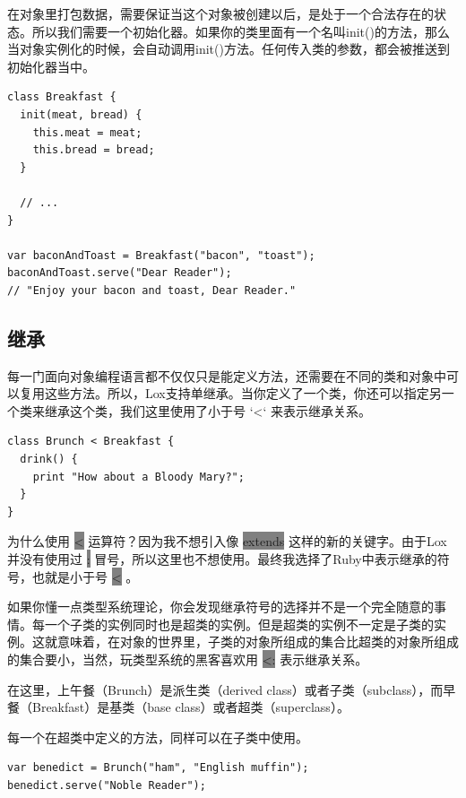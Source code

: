 \documentclass[cn,10pt,math=newtx,citestyle=gb7714-2015,bibstyle=gb7714-2015]{elegantbook}
\begin{document}
在对象里打包数据，需要保证当这个对象被创建以后，是处于一个合法存在的状态。所以我们需要一个初始化器。如果你的类里面有一个名叫init()的方法，那么当对象实例化的时候，会自动调用init()方法。任何传入类的参数，都会被推送到初始化器当中。

\begin{verbatim}
class Breakfast {
  init(meat, bread) {
    this.meat = meat;
    this.bread = bread;
  }

  // ...
}

var baconAndToast = Breakfast("bacon", "toast");
baconAndToast.serve("Dear Reader");
// "Enjoy your bacon and toast, Dear Reader."
\end{verbatim}

\subsection{继承}

每一门面向对象编程语言都不仅仅只是能定义方法，还需要在不同的类和对象中可以复用这些方法。所以，Lox支持单继承。当你定义了一个类，你还可以指定另一个类来继承这个类，我们这里使用了小于号 `<` 来表示继承关系。

\begin{verbatim}
class Brunch < Breakfast {
  drink() {
    print "How about a Bloody Mary?";
  }
}
\end{verbatim}

\begin{tcolorbox}
为什么使用 \colorbox{gray}{<} 运算符？因为我不想引入像 \colorbox{gray}{extends} 这样的新的关键字。由于Lox并没有使用过 \colorbox{gray}{:} 冒号，所以这里也不想使用。最终我选择了Ruby中表示继承的符号，也就是小于号 \colorbox{gray}{<} 。

如果你懂一点类型系统理论，你会发现继承符号的选择并不是一个完全随意的事情。每一个子类的实例同时也是超类的实例。但是超类的实例不一定是子类的实例。这就意味着，在对象的世界里，子类的对象所组成的集合比超类的对象所组成的集合要小，当然，玩类型系统的黑客喜欢用 \colorbox{gray}{<:} 表示继承关系。
\end{tcolorbox}

在这里，上午餐（Brunch）是派生类（derived class）或者子类（subclass），而早餐（Breakfast）是基类（base class）或者超类（superclass）。

每一个在超类中定义的方法，同样可以在子类中使用。

\begin{verbatim}
var benedict = Brunch("ham", "English muffin");
benedict.serve("Noble Reader");
\end{verbatim}
\end{document}

